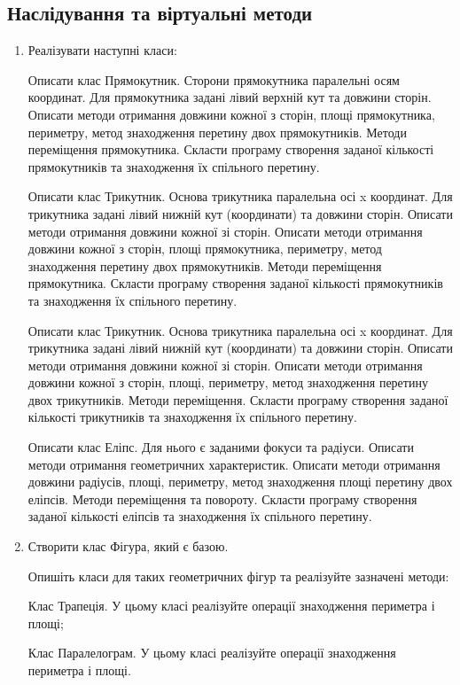 \documentclass[]{article}
\begin{document}
\subsection{ Наслідування та віртуальні методи}

\begin{enumerate}
\item
Реалізувати наступні класи:

Описати клас Прямокутник. Сторони прямокутника паралельні осям
координат. Для прямокутника задані лівий верхній кут та довжини сторін.
Описати методи отримання довжини кожної з сторін, площі прямокутника,
периметру, метод знаходження перетину двох прямокутників. Методи
переміщення прямокутника. Скласти програму створення заданої кількості
прямокутників та знаходження їх спільного перетину.

Описати клас Трикутник. Основа трикутника паралельна осі x координат.
Для трикутника задані лівий нижній кут (координати) та довжини сторін.
Описати методи отримання довжини кожної зі сторін. Описати методи
отримання довжини кожної з сторін, площі прямокутника, периметру, метод
знаходження перетину двох прямокутників. Методи переміщення
прямокутника. Скласти програму створення заданої кількості прямокутників
та знаходження їх спільного перетину.

Описати клас Трикутник. Основа трикутника паралельна осі x координат.
Для трикутника задані лівий нижній кут (координати) та довжини сторін.
Описати методи отримання довжини кожної зі сторін. Описати методи
отримання довжини кожної з сторін, площі, периметру, метод знаходження
перетину двох трикутників. Методи переміщення. Скласти програму
створення заданої кількості трикутників та знаходження їх спільного
перетину.

Описати клас Еліпс. Для нього є заданими фокуси та радіуси. Описати
методи отримання геометричних характеристик. Описати методи отримання
довжини радіусів, площі, периметру, метод знаходження площі перетину
двох еліпсів. Методи переміщення та повороту. Скласти програму створення
заданої кількості еліпсів та знаходження їх спільного перетину.

\item
Створити клас Фігура, який є базою.

Опишіть класи для таких геометричних фігур та реалізуйте зазначені
методи:

Клас Трапеція. У цьому класі реалізуйте операції знаходження периметра і
площі;

Клас Паралелограм. У цьому класі реалізуйте операції знаходження
периметра і площі.


\end{enumerate}
\end{document}
